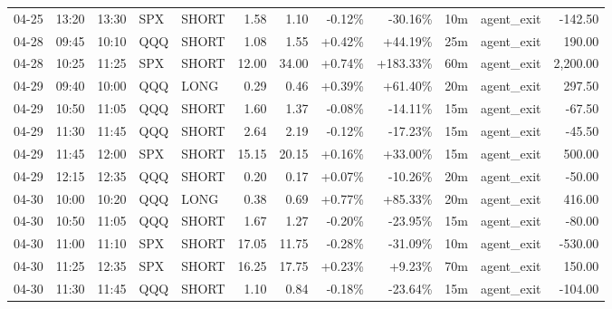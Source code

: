 \documentclass[11pt,a4paper]{article}
\begin{document}
\begin{center}
\begin{longtable}{>{\color{txtmain}}l l l l l r r r r r >{\color{txtmain}}l r}
04-25 & 13:20 & 13:30 & SPX & SHORT & 1.58 & 1.10 & \textcolor{lossred}{-0.12\%} & \textcolor{lossred}{-30.16\%} & 10m & agent\_exit & \textcolor{lossred}{-142.50} \\
04-28 & 09:45 & 10:10 & QQQ & SHORT & 1.08 & 1.55 & \textcolor{wingreen}{+0.42\%} & \textcolor{wingreen}{+44.19\%} & 25m & agent\_exit & \textcolor{wingreen}{190.00} \\
04-28 & 10:25 & 11:25 & SPX & SHORT & 12.00 & 34.00 & \textcolor{wingreen}{+0.74\%} & \textcolor{wingreen}{+183.33\%} & 60m & agent\_exit & \textcolor{wingreen}{2,200.00} \\
04-29 & 09:40 & 10:00 & QQQ & LONG & 0.29 & 0.46 & \textcolor{wingreen}{+0.39\%} & \textcolor{wingreen}{+61.40\%} & 20m & agent\_exit & \textcolor{wingreen}{297.50} \\
04-29 & 10:50 & 11:05 & QQQ & SHORT & 1.60 & 1.37 & \textcolor{lossred}{-0.08\%} & \textcolor{lossred}{-14.11\%} & 15m & agent\_exit & \textcolor{lossred}{-67.50} \\
04-29 & 11:30 & 11:45 & QQQ & SHORT & 2.64 & 2.19 & \textcolor{lossred}{-0.12\%} & \textcolor{lossred}{-17.23\%} & 15m & agent\_exit & \textcolor{lossred}{-45.50} \\
04-29 & 11:45 & 12:00 & SPX & SHORT & 15.15 & 20.15 & \textcolor{wingreen}{+0.16\%} & \textcolor{wingreen}{+33.00\%} & 15m & agent\_exit & \textcolor{wingreen}{500.00} \\
04-29 & 12:15 & 12:35 & QQQ & SHORT & 0.20 & 0.17 & \textcolor{wingreen}{+0.07\%} & \textcolor{lossred}{-10.26\%} & 20m & agent\_exit & \textcolor{lossred}{-50.00} \\
04-30 & 10:00 & 10:20 & QQQ & LONG & 0.38 & 0.69 & \textcolor{wingreen}{+0.77\%} & \textcolor{wingreen}{+85.33\%} & 20m & agent\_exit & \textcolor{wingreen}{416.00} \\
04-30 & 10:50 & 11:05 & QQQ & SHORT & 1.67 & 1.27 & \textcolor{lossred}{-0.20\%} & \textcolor{lossred}{-23.95\%} & 15m & agent\_exit & \textcolor{lossred}{-80.00} \\
04-30 & 11:00 & 11:10 & SPX & SHORT & 17.05 & 11.75 & \textcolor{lossred}{-0.28\%} & \textcolor{lossred}{-31.09\%} & 10m & agent\_exit & \textcolor{lossred}{-530.00} \\
04-30 & 11:25 & 12:35 & SPX & SHORT & 16.25 & 17.75 & \textcolor{wingreen}{+0.23\%} & \textcolor{wingreen}{+9.23\%} & 70m & agent\_exit & \textcolor{wingreen}{150.00} \\
04-30 & 11:30 & 11:45 & QQQ & SHORT & 1.10 & 0.84 & \textcolor{lossred}{-0.18\%} & \textcolor{lossred}{-23.64\%} & 15m & agent\_exit & \textcolor{lossred}{-104.00} \\

\end{longtable}
\end{center}
\end{document}
